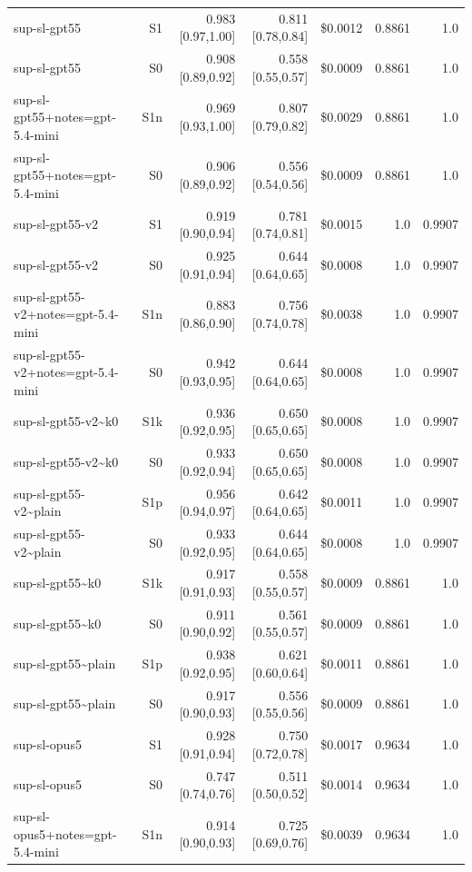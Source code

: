 \documentclass[11pt]{article}
\begin{document}
{\begin{longtable}{lrrrrrr}
sup-sl-gpt55 & S1 & 0.983 [0.97,1.00] & 0.811 [0.78,0.84] & \$0.0012 & 0.8861 & 1.0 \\
sup-sl-gpt55 & S0 & 0.908 [0.89,0.92] & 0.558 [0.55,0.57] & \$0.0009 & 0.8861 & 1.0 \\
sup-sl-gpt55+notes=gpt-5.4-mini & S1n & 0.969 [0.93,1.00] & 0.807 [0.79,0.82] & \$0.0029 & 0.8861 & 1.0 \\
sup-sl-gpt55+notes=gpt-5.4-mini & S0 & 0.906 [0.89,0.92] & 0.556 [0.54,0.56] & \$0.0009 & 0.8861 & 1.0 \\
sup-sl-gpt55-v2 & S1 & 0.919 [0.90,0.94] & 0.781 [0.74,0.81] & \$0.0015 & 1.0 & 0.9907 \\
sup-sl-gpt55-v2 & S0 & 0.925 [0.91,0.94] & 0.644 [0.64,0.65] & \$0.0008 & 1.0 & 0.9907 \\
sup-sl-gpt55-v2+notes=gpt-5.4-mini & S1n & 0.883 [0.86,0.90] & 0.756 [0.74,0.78] & \$0.0038 & 1.0 & 0.9907 \\
sup-sl-gpt55-v2+notes=gpt-5.4-mini & S0 & 0.942 [0.93,0.95] & 0.644 [0.64,0.65] & \$0.0008 & 1.0 & 0.9907 \\
sup-sl-gpt55-v2\textasciitilde{}k0 & S1k & 0.936 [0.92,0.95] & 0.650 [0.65,0.65] & \$0.0008 & 1.0 & 0.9907 \\
sup-sl-gpt55-v2\textasciitilde{}k0 & S0 & 0.933 [0.92,0.94] & 0.650 [0.65,0.65] & \$0.0008 & 1.0 & 0.9907 \\
sup-sl-gpt55-v2\textasciitilde{}plain & S1p & 0.956 [0.94,0.97] & 0.642 [0.64,0.65] & \$0.0011 & 1.0 & 0.9907 \\
sup-sl-gpt55-v2\textasciitilde{}plain & S0 & 0.933 [0.92,0.95] & 0.644 [0.64,0.65] & \$0.0008 & 1.0 & 0.9907 \\
sup-sl-gpt55\textasciitilde{}k0 & S1k & 0.917 [0.91,0.93] & 0.558 [0.55,0.57] & \$0.0009 & 0.8861 & 1.0 \\
sup-sl-gpt55\textasciitilde{}k0 & S0 & 0.911 [0.90,0.92] & 0.561 [0.55,0.57] & \$0.0009 & 0.8861 & 1.0 \\
sup-sl-gpt55\textasciitilde{}plain & S1p & 0.938 [0.92,0.95] & 0.621 [0.60,0.64] & \$0.0011 & 0.8861 & 1.0 \\
sup-sl-gpt55\textasciitilde{}plain & S0 & 0.917 [0.90,0.93] & 0.556 [0.55,0.56] & \$0.0009 & 0.8861 & 1.0 \\
sup-sl-opus5 & S1 & 0.928 [0.91,0.94] & 0.750 [0.72,0.78] & \$0.0017 & 0.9634 & 1.0 \\
sup-sl-opus5 & S0 & 0.747 [0.74,0.76] & 0.511 [0.50,0.52] & \$0.0014 & 0.9634 & 1.0 \\
sup-sl-opus5+notes=gpt-5.4-mini & S1n & 0.914 [0.90,0.93] & 0.725 [0.69,0.76] & \$0.0039 & 0.9634 & 1.0 \\

\end{longtable}}
\end{document}
